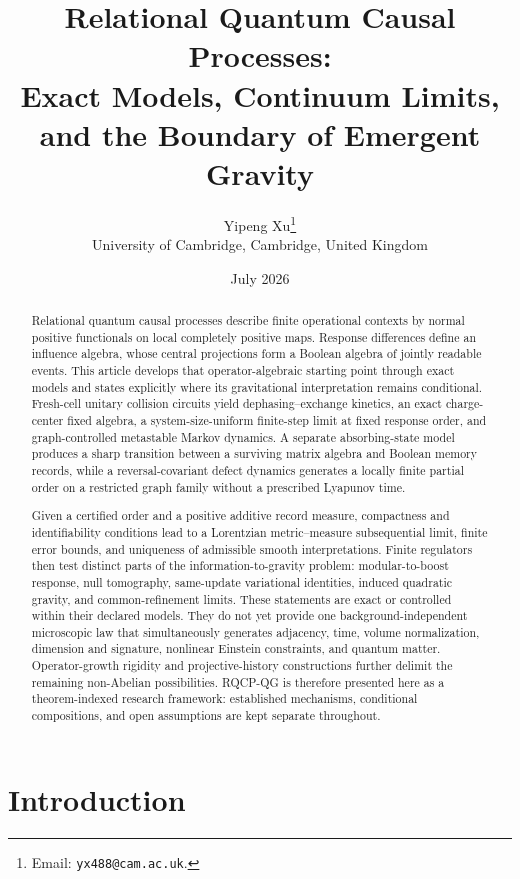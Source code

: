 \documentclass[11pt]{article}
\title{Relational Quantum Causal Processes:\\
\large Exact Models, Continuum Limits, and the Boundary of Emergent Gravity}
\author{Yipeng Xu\thanks{Email: \texttt{yx488@cam.ac.uk}.}\\
\small University of Cambridge, Cambridge, United Kingdom}
\date{July 2026}
\begin{document}
\maketitle

\begin{abstract}
Relational quantum causal processes describe finite operational contexts by
normal positive functionals on local completely positive maps.  Response
differences define an influence algebra, whose central projections form a
Boolean algebra of jointly readable events.  This article develops that
operator-algebraic starting point through exact models and states explicitly
where its gravitational interpretation remains conditional.  Fresh-cell
unitary collision circuits yield dephasing--exchange kinetics, an exact
charge-center fixed algebra, a system-size-uniform finite-step limit at fixed
response order, and graph-controlled metastable Markov dynamics.  A separate
absorbing-state model produces a sharp transition between a surviving matrix
algebra and Boolean memory records, while a reversal-covariant defect
dynamics generates a locally finite partial order on a restricted graph
family without a prescribed Lyapunov time.

Given a certified order and a positive additive record measure, compactness
and identifiability conditions lead to a Lorentzian metric--measure
subsequential limit, finite error bounds, and uniqueness of admissible smooth
interpretations.  Finite regulators then test distinct parts of the
information-to-gravity problem: modular-to-boost response, null tomography,
same-update variational identities, induced quadratic gravity, and
common-refinement limits.  These statements are exact or controlled within
their declared models.  They do not yet provide one background-independent
microscopic law that simultaneously generates adjacency, time, volume
normalization, dimension and signature, nonlinear Einstein constraints, and
quantum matter.  Operator-growth rigidity and projective-history
constructions further delimit the remaining non-Abelian possibilities.
RQCP-QG is therefore presented here as a theorem-indexed research framework:
established mechanisms, conditional compositions, and open assumptions are
kept separate throughout.
\end{abstract}

\newpage
\tableofcontents

\newpage
\section{Introduction}\label{sec:introduction}
\end{document}
